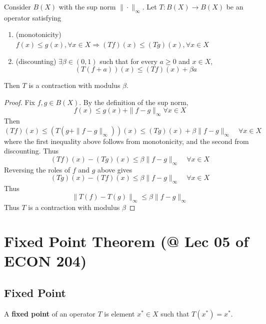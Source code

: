 \documentclass[11pt]{elegantbook}
\begin{document}
\begin{theorem}
    Consider $B(X)$ with the sup norm $\|\cdot\|_\infty$. Let $T : B(X) \rightarrow B(X)$ be an operator satisfying
    \begin{enumerate}
        \item (monotonicity) $f(x) \leq g(x), \forall x\in X \Rightarrow (T f)(x) \leq (T g)(x), \forall x \in X$
        \item (discounting) $\exists \beta \in (0, 1)$ such that for every $a \geq 0$ and $x \in X$, $$(T (f + a)) (x) \leq (T f)(x) + \beta a$$
    \end{enumerate}
    Then $T$ is a contraction with modulus $\beta$.
\end{theorem}
\begin{proof}
    Fix $f, g \in B(X)$. By the definition of the sup norm,
    $$
    f(x) \leq g(x)+\|f-g\|_{\infty} \forall x \in X
    $$
    Then
    $$
    (T f)(x) \leq\left(T\left(g+\|f-g\|_{\infty}\right)\right)(x) \leq(T g)(x)+\beta\|f-g\|_{\infty} \quad \forall x \in X
    $$
    where the first inequality above follows from monotonicity, and the second from discounting. Thus
    $$
    (T f)(x)-(T g)(x) \leq \beta\|f-g\|_{\infty} \quad \forall x \in X
    $$
    Reversing the roles of $f$ and $g$ above gives
    $$
    (T g)(x)-(T f)(x) \leq \beta\|f-g\|_{\infty} \quad \forall x \in X
    $$
    Thus
    $$
    \|T(f)-T(g)\|_{\infty} \leq \beta\|f-g\|_{\infty}
    $$
    Thus $T$ is a contraction with modulus $\beta$
\end{proof}


\section{Fixed Point Theorem \small{(@ Lec 05 of ECON 204)}}
\subsection{Fixed Point}
\begin{definition}
    \normalfont
    A \textbf{fixed point} of an operator $T$ is element $x^*\in X$ such that $T(x^*)=x^*$.
\end{definition}
\end{document}
